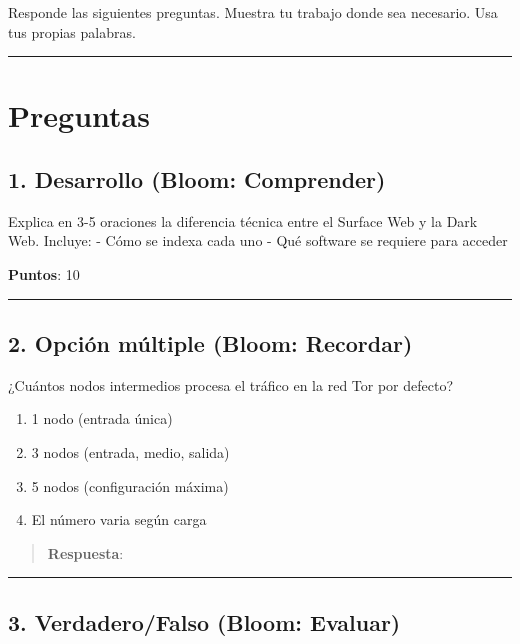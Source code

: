 \documentclass[
  letterpaper,
]{report}
\providecommand{\tightlist}{%
  \setlength{\itemsep}{0pt}\setlength{\parskip}{0pt}}
\begin{document}
Responde las siguientes preguntas. Muestra tu trabajo donde sea
necesario. Usa tus propias palabras.

\begin{center}\rule{0.5\linewidth}{0.5pt}\end{center}

\section{Preguntas}\label{preguntas}

\subsection{1. Desarrollo (Bloom:
Comprender)}\label{desarrollo-bloom-comprender}

Explica en 3-5 oraciones la diferencia técnica entre el Surface Web y la
Dark Web. Incluye: - Cómo se indexa cada uno - Qué software se requiere
para acceder

\textbf{Puntos}: 10

\begin{center}\rule{0.5\linewidth}{0.5pt}\end{center}

\subsection{2. Opción múltiple (Bloom:
Recordar)}\label{opciuxf3n-muxfaltiple-bloom-recordar}

¿Cuántos nodos intermedios procesa el tráfico en la red Tor por defecto?

\begin{enumerate}
\def\labelenumi{\alph{enumi})}
\tightlist
\item
  1 nodo (entrada única)
\item
  3 nodos (entrada, medio, salida)
\item
  5 nodos (configuración máxima)
\item
  El número varia según carga
\end{enumerate}

\begin{quote}
\textbf{Respuesta}:
\end{quote}

\begin{center}\rule{0.5\linewidth}{0.5pt}\end{center}

\subsection{3. Verdadero/Falso (Bloom:
Evaluar)}\label{verdaderofalso-bloom-evaluar}
\end{document}
